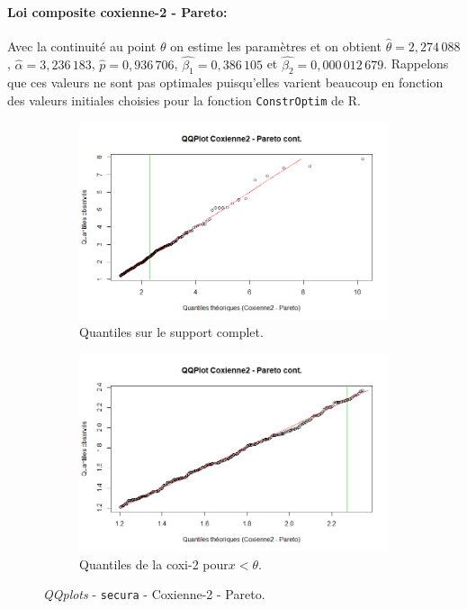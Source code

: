 		\paragraph{Loi composite coxienne-2 - Pareto:} Avec la continuité au point $\theta$ on estime les paramètres et on obtient $\hat{\theta} = 2,274\,088$, $\hat{\alpha}= 3,236\,183$, $\hat{p} = 0,936\,706$, $\hat{\beta_1}=0,386\,105$ et $\hat{\beta_2}= 0,000\,012\,679$. Rappelons que ces valeurs ne sont pas optimales puisqu'elles varient beaucoup en fonction des valeurs initiales choisies pour la fonction \texttt{ConstrOptim} de R. 
		\begin{figure}[H]
			\begin{center}
				\begin{subfigure}[b]{0.45\textwidth}
					\includegraphics[scale=0.40]{Graphiques/QQ_Cox_Pa_cont_secura} 
					\caption{Quantiles sur le support complet.} \label{QQplot_Cox_Pa_con_sec}
				\end{subfigure}
				\begin{subfigure}[b]{0.4\textwidth}
					\includegraphics[scale=0.40]{Graphiques/QQ_Cox_Pa_cont_t1_secura} 
					\caption{Quantiles de la coxi-2 pour$ x<\theta$.} \label{QQplot_Cox_Pa_con_2_sec}
				\end{subfigure}
				\renewcommand{\figurename}{Illustration}
				\caption{\textit{QQplots} - \texttt{secura} - Coxienne-2 - Pareto.}
			\end{center}
		\end{figure}
		
